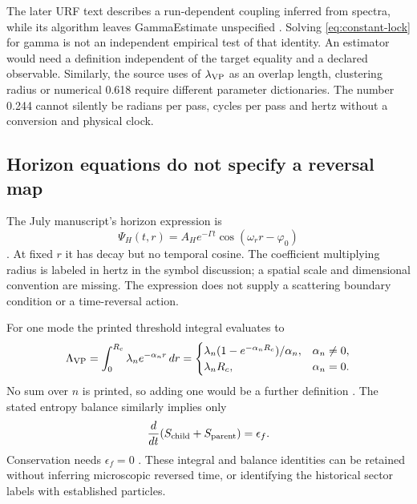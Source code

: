 \documentclass[11pt,a4paper]{article}
\theoremstyle{definition}
\numberwithin{equation}{section}
\begin{document}
The later URF text describes a run-dependent coupling inferred from
spectra, while its algorithm leaves GammaEstimate unspecified
\cite[physical pp.~8--9,13]{P19}.
Solving \eqref{eq:constant-lock} for gamma is not an independent empirical
test of that identity. An estimator would need a definition independent of
the target equality and a declared observable.
Similarly, the source uses of $\lambda_{\rm VP}$ as an overlap length,
clustering radius or numerical 0.618 require different parameter dictionaries.
The number 0.244 cannot silently be radians per pass, cycles per pass and
hertz without a conversion and physical clock.

\subsection{Horizon equations do not specify a reversal map}

The July manuscript's horizon expression is
\begin{equation}
 \Psi_H(t,r)=A_He^{-\Gamma t}\cos(\omega_r r-\varphi_0)
 \label{eq:horizon}
\end{equation}
\cite[physical p.~4, Eq.~(3)]{P06}.
At fixed $r$ it has decay but no temporal cosine. The coefficient
multiplying radius is labeled in hertz in the symbol discussion; a
spatial scale and dimensional convention are missing. The expression
does not supply a scattering boundary condition or a time-reversal action.

For one mode the printed threshold integral evaluates to
\begin{equation}
 \Lambda_{\rm VP}=\int_0^{R_c}\lambda_n e^{-\alpha_n r}\,dr
 =
 \begin{cases}
 \lambda_n(1-e^{-\alpha_nR_c})/\alpha_n,&\alpha_n\ne0,\\
 \lambda_nR_c,&\alpha_n=0 .
 \end{cases}
 \label{eq:threshold-integral}
\end{equation}
No sum over $n$ is printed, so adding one would be a further definition
\cite[physical p.~4, Eq.~(5)]{P06}.
The stated entropy balance similarly implies only
\begin{equation}
 \frac{d}{dt}(S_{\rm child}+S_{\rm parent})=\epsilon_f.
 \label{eq:entropy}
\end{equation}
Conservation needs $\epsilon_f=0$
\cite[physical p.~5, Eq.~(7)]{P06}.
These integral and balance identities can be retained without inferring
microscopic reversed time, or identifying the historical sector labels
with established particles.
\end{document}
